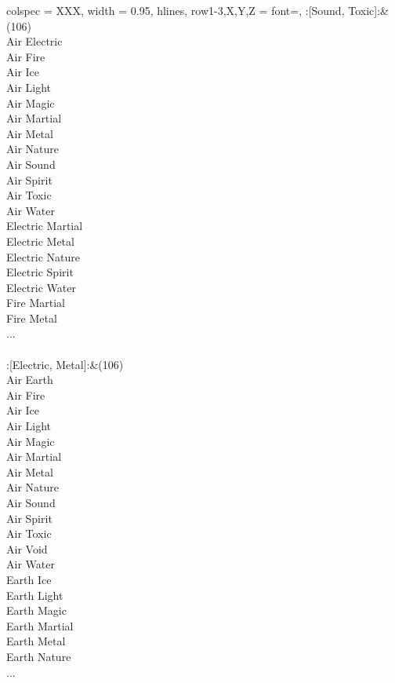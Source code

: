 \begin{longtblr}[
	caption = {2v2 Attacking Effective},
	label = {2v2-Attacking-Effective},
]{
	colspec = {XXX}, width = 0.95\linewidth,
	hlines,
	row{1-3,X,Y,Z} = {font=\bfseries},
}
	:[Sound, Toxic]:&{(106)\\
	Air Electric \\
	Air Fire \\
	Air Ice \\
	Air Light \\
	Air Magic \\
	Air Martial \\
	Air Metal \\
	Air Nature \\
	Air Sound \\
	Air Spirit \\
	Air Toxic \\
	Air Water \\
	Electric Martial \\
	Electric Metal \\
	Electric Nature \\
	Electric Spirit \\
	Electric Water \\
	Fire Martial \\
	Fire Metal \\
	...\\
	}\\

	:[Electric, Metal]:&{(106)\\
	Air Earth \\
	Air Fire \\
	Air Ice \\
	Air Light \\
	Air Magic \\
	Air Martial \\
	Air Metal \\
	Air Nature \\
	Air Sound \\
	Air Spirit \\
	Air Toxic \\
	Air Void \\
	Air Water \\
	Earth Ice \\
	Earth Light \\
	Earth Magic \\
	Earth Martial \\
	Earth Metal \\
	Earth Nature \\
	...\\
	}\\


\end{longtblr}

